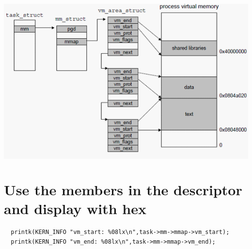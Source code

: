   \includegraphics[scale=0.8]{pic/vm_organize.png}
  
  \section{Use the members in the descriptor and display with hex}
  \begin{verbatim}
  printk(KERN_INFO "vm_start: %08lx\n",task->mm->mmap->vm_start);
  printk(KERN_INFO "vm_end: %08lx\n",task->mm->mmap->vm_end);
  \end{verbatim}